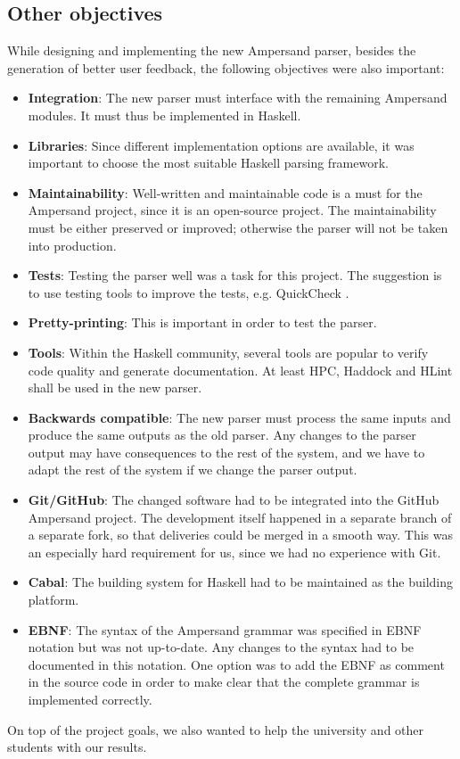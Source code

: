
\subsection{Other objectives}
While designing and implementing the new Ampersand parser, besides the generation of better user feedback, the following objectives were also important:
\begin{itemize}
  \item \textbf{Integration}: The new parser must interface with the remaining Ampersand modules.
    It must thus be implemented in Haskell.
  \item \textbf{Libraries}: Since different implementation options are available, it was important to choose the most suitable Haskell parsing framework.
  \item \textbf{Maintainability}: Well-written and maintainable code is a must for the Ampersand project, since it is an open-source project.
    The maintainability must be either preserved or improved; otherwise the parser will not be taken into production.
  \item \textbf{Tests}: Testing the parser well was a task for this project.
    The suggestion is to use testing tools to improve the tests, e.g. QuickCheck .
  \item \textbf{Pretty-printing}: This is important in order to test the parser.
%
%
%
  \item \textbf{Tools}: Within the Haskell community, several tools are popular to verify code quality and generate documentation.
    At least HPC, Haddock and HLint shall be used in the new parser.
  \item \textbf{Backwards compatible}: The new parser must process the same inputs and produce the same outputs as the old parser.
    Any changes to the parser output may have consequences to the rest of the system, and we have to adapt the rest of the system if we change the parser output.
  \item \textbf{Git/GitHub}: The changed software had to be integrated into the GitHub Ampersand project.
    The development itself happened in a separate branch of a separate fork, so that deliveries could be merged in a smooth way.
    This was an especially hard requirement for us, since we had no experience with Git.
  \item \textbf{Cabal}: The building system for Haskell had to be maintained as the building platform.
  \item \textbf{EBNF}: The syntax of the Ampersand grammar was specified in EBNF notation but was not up-to-date.
    Any changes to the syntax had to be documented in this notation.
    One option was to add the EBNF as comment in the source code in order to make clear that the complete grammar is implemented correctly.
\end{itemize}

On top of the project goals, we also wanted to help the university and other students with our results.
